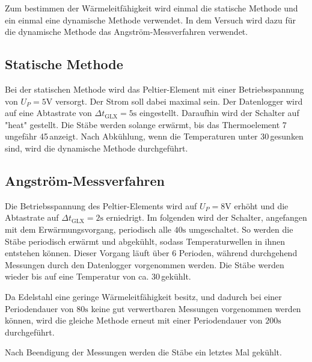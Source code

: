 Zum bestimmen der Wärmeleitfähigkeit wird einmal die statische Methode und ein einmal eine dynamische Methode verwendet. In dem Versuch wird dazu für die dynamische Methode das Angström-Messverfahren verwendet.


\subsection{Statische Methode}
Bei der statischen Methode wird das Peltier-Element mit einer Betriebsspannung von $U_P=5\si{\volt}$ versorgt. Der Strom soll dabei maximal sein. Der Datenlogger wird auf eine Abtastrate von $\Delta t_{\text{GLX}}=5\si{\s}$ eingestellt. Daraufhin wird der Schalter auf "heat" gestellt. Die Stäbe werden solange erwärmt, bis das Thermoelement 7 ungefähr 45\textcelsius \,anzeigt. 
Nach Abkühlung, wenn die Temperaturen unter 30\textcelsius \,gesunken sind, wird die dynamische Methode durchgeführt.

\subsection{Angström-Messverfahren}
Die Betriebsspannung des Peltier-Elements wird auf $U_P=8\si{\volt}$ erhöht und die Abtastrate auf $\Delta t_{\text{GLX}}=2\si{\s}$ erniedrigt.
Im folgenden wird der Schalter, angefangen mit dem Erwärmungsvorgang, periodisch alle $40 \si{\s}$ umgeschaltet. So werden die Stäbe periodisch erwärmt und abgekühlt, sodass Temperaturwellen in ihnen entstehen können. Dieser Vorgang läuft über 6 Perioden, während durchgehend Messungen durch den Datenlogger vorgenommen werden.
Die Stäbe werden wieder bis auf eine Temperatur von ca. 30\textcelsius \,gekühlt.

Da Edelstahl eine geringe Wärmeleitfähigkeit besitz, und dadurch bei einer Periodendauer von $80\si{\s}$ keine gut verwertbaren Messungen vorgenommen werden können, wird die gleiche Methode erneut mit einer Periodendauer von $200\si{\s}$ durchgeführt.

Nach Beendigung der Messungen werden die Stäbe ein letztes Mal gekühlt.
